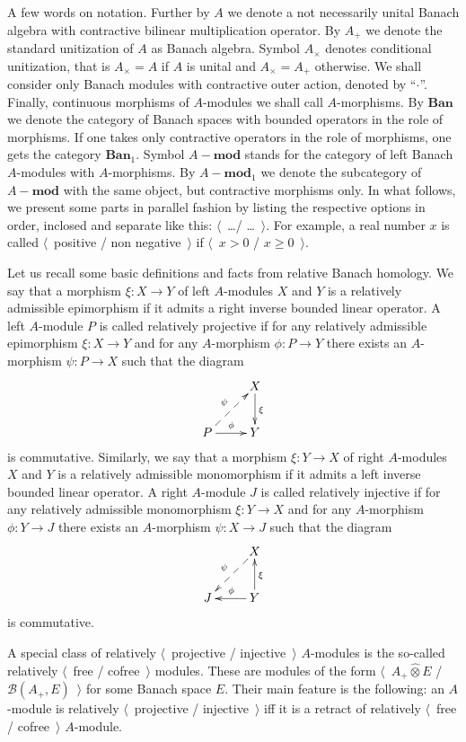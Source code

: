 \documentclass[12pt]{article}
\newcommand{\projtens}{\mathbin{\widehat{\otimes}}}
\begin{document}
A few words on notation. Further by $A$ we denote a not necessarily unital
Banach algebra with contractive bilinear multiplication operator. By $A_+$ we
denote the standard unitization of $A$ as Banach algebra. Symbol $A_\times$
denotes conditional unitization, that is $A_\times=A$ if $A$ is unital and
$A_\times=A_+$ otherwise. We shall consider only Banach modules with contractive
outer action, denoted by ``$\cdot$''. Finally, continuous morphisms of
$A$-modules we shall call $A$-morphisms. By $\mathbf{Ban}$ we denote the
category of Banach spaces with bounded operators in the role of morphisms. If
one takes only contractive operators in the role of morphisms, one gets the
category $\mathbf{Ban}_1$. Symbol $A-\mathbf{mod}$ stands for the category of left
Banach $A$-modules with $A$-morphisms. By $A-\mathbf{mod}_1$ we denote the subcategory
of $A-\mathbf{mod}$ with the same object, but contractive morphisms only. In what
follows, we present some parts in parallel fashion by listing the respective
options in order, inclosed and separate like this: $\langle$~\ldots /
\ldots~$\rangle$. For example, a real number $x$ is called $\langle$~positive /
non negative~$\rangle$ if $\langle$~$x>0$ / $x\geq 0$~$\rangle$.

Let us recall some basic definitions and facts from relative Banach homology. We
say that a morphism $\xi:X\to Y$ of left $A$-modules $X$ and $Y$ is a relatively
admissible epimorphism if it admits a right inverse bounded linear operator. A
left $A$-module $P$ is called relatively projective if for any relatively
admissible  epimorphism $\xi:X\to Y$ and for any $A$-morphism $\phi:P\to Y$
there exists an $A$-morphism $\psi:P\to X$ such that the diagram
$$
    \xymatrix{
    & {X} \ar[d]^{\xi}\\  %
    {P} \ar@{-->}[ur]^{\psi} \ar[r]^{\phi} &{Y}}  %
$$
is commutative. Similarly,  we say that a morphism $\xi:Y\to X$ of right
$A$-modules $X$ and $Y$ is a relatively admissible monomorphism if it admits a
left inverse bounded linear operator. A right $A$-module $J$ is called
relatively injective if for any relatively admissible  monomorphism $\xi:Y\to X$
and for any $A$-morphism $\phi:Y\to J$ there exists an $A$-morphism $\psi:X\to
    J$ such that the diagram
$$
    \xymatrix{
    & {X} \ar@{-->}[dl]_{\psi} \\  %
    {J} &{Y} \ar[l]_{\phi} \ar[u]_{\xi}}  %
$$
is commutative.

A special class of relatively $\langle$~projective / injective~$\rangle$
$A$-modules is the so-called relatively $\langle$~free / cofree~$\rangle$
modules. These are modules of the form $\langle$~$A_+\projtens E$ /
$\mathcal{B}(A_+,E)$~$\rangle$ for some Banach space $E$. Their main feature is
the following: an $A$-module is relatively $\langle$~projective /
injective~$\rangle$ iff it is a retract of relatively $\langle$~free /
cofree~$\rangle$ $A$-module.
\end{document}
